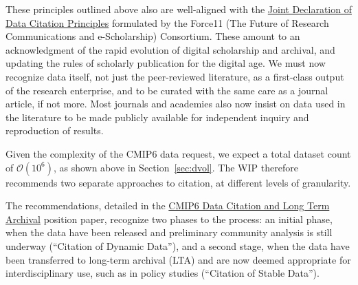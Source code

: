 \documentclass[gmd,manuscript]{copernicus}
\newcommand{\secref}[1] {\mbox{Section  \ref{sec:#1}}}
\begin{document}
These principles outlined above also are well-aligned with the
\href{https://goo.gl/Pzb7F6}{Joint Declaration of Data Citation
  Principles} formulated by the Force11 (The Future of Research
Communications and e-Scholarship) Consortium. These amount to an
acknowledgment of the rapid evolution of digital scholarship and
archival, and updating the rules of scholarly publication for the
digital age. We must now recognize data itself, not just the
peer-reviewed literature, as a first-class output of the research
enterprise, and to be curated with the same care as a journal article,
if not more. Most journals and academies also now insist on data used
in the literature to be made publicly available for independent
inquiry and reproduction of results.

Given the complexity of the CMIP6 data request, we expect a total
dataset count of $\mathcal{O}(10^6)$, as shown above in \secref{dvol}.
The WIP therefore recommends two separate approaches to citation, at
different levels of granularity.

The recommendations, detailed in the
\href{https://goo.gl/CZyWq1}{CMIP6 Data Citation and Long Term
  Archival} position paper, recognize two phases to the process: an
initial phase, when the data have been released and preliminary
community analysis is still underway (``Citation of Dynamic Data''),
and a second stage, when the data have been transferred to long-term
archival (LTA) and are now deemed appropriate for interdisciplinary
use, such as in policy studies (``Citation of Stable Data'').
\end{document}

